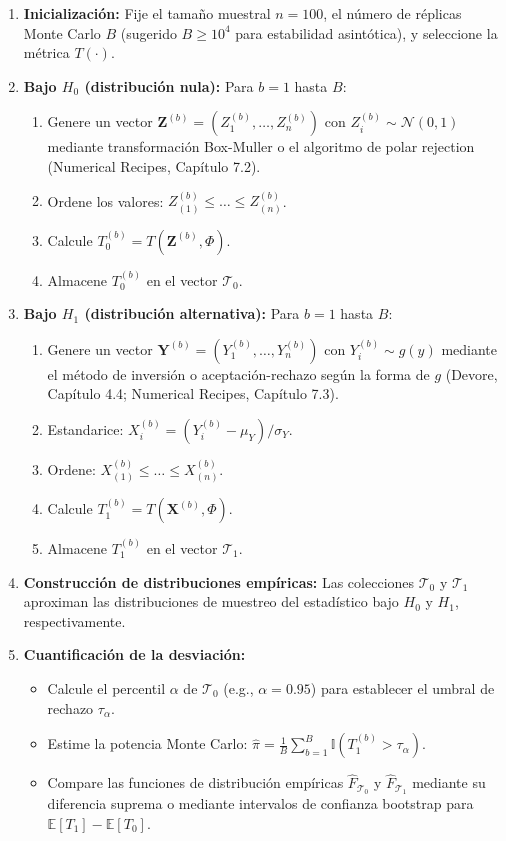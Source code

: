 \documentclass[12pt]{article}
\begin{document}
\begin{enumerate}
    \item \textbf{Inicialización:} Fije el tamaño muestral $n = 100$, el número de réplicas Monte Carlo $B$ (sugerido $B \geq 10^4$ para estabilidad asintótica), y seleccione la métrica $T(\cdot)$.
    \item \textbf{Bajo $H_0$ (distribución nula):} Para $b = 1$ hasta $B$:
    \begin{enumerate}
        \item Genere un vector $\mathbf{Z}^{(b)} = (Z_1^{(b)}, \dots, Z_n^{(b)})$ con $Z_i^{(b)} \sim \mathcal{N}(0,1)$ mediante transformación Box-Muller o el algoritmo de polar rejection (Numerical Recipes, Capítulo 7.2).
        \item Ordene los valores: $Z_{(1)}^{(b)} \leq \dots \leq Z_{(n)}^{(b)}$.
        \item Calcule $T_0^{(b)} = T(\mathbf{Z}^{(b)}, \Phi)$.
        \item Almacene $T_0^{(b)}$ en el vector $\mathcal{T}_0$.
    \end{enumerate}
    \item \textbf{Bajo $H_1$ (distribución alternativa):} Para $b = 1$ hasta $B$:
    \begin{enumerate}
        \item Genere un vector $\mathbf{Y}^{(b)} = (Y_1^{(b)}, \dots, Y_n^{(b)})$ con $Y_i^{(b)} \sim g(y)$ mediante el método de inversión o aceptación-rechazo según la forma de $g$ (Devore, Capítulo 4.4; Numerical Recipes, Capítulo 7.3).
        \item Estandarice: $X_i^{(b)} = (Y_i^{(b)} - \mu_Y)/\sigma_Y$.
        \item Ordene: $X_{(1)}^{(b)} \leq \dots \leq X_{(n)}^{(b)}$.
        \item Calcule $T_1^{(b)} = T(\mathbf{X}^{(b)}, \Phi)$.
        \item Almacene $T_1^{(b)}$ en el vector $\mathcal{T}_1$.
    \end{enumerate}
    \item \textbf{Construcción de distribuciones empíricas:} Las colecciones $\mathcal{T}_0$ y $\mathcal{T}_1$ aproximan las distribuciones de muestreo del estadístico bajo $H_0$ y $H_1$, respectivamente.
    \item \textbf{Cuantificación de la desviación:} 
    \begin{itemize}
        \item Calcule el percentil $\alpha$ de $\mathcal{T}_0$ (e.g., $\alpha=0.95$) para establecer el umbral de rechazo $\tau_\alpha$.
        \item Estime la potencia Monte Carlo: $\hat{\pi} = \frac{1}{B} \sum_{b=1}^B \mathbb{I}(T_1^{(b)} > \tau_\alpha)$.
        \item Compare las funciones de distribución empíricas $\hat{F}_{\mathcal{T}_0}$ y $\hat{F}_{\mathcal{T}_1}$ mediante su diferencia suprema o mediante intervalos de confianza bootstrap para $\mathbb{E}[T_1] - \mathbb{E}[T_0]$.
    \end{itemize}
\end{enumerate}
\end{document}
